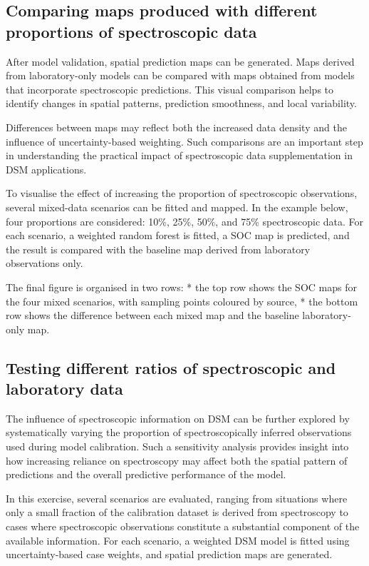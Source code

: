 \documentclass[
  10pt,
  b5paper,
  oneside]{book}
\begin{document}
\subsection{Comparing maps produced with different proportions of spectroscopic data}\label{comparing-maps-produced-with-different-proportions-of-spectroscopic-data}

After model validation, spatial prediction maps can be generated. Maps derived from laboratory-only models can be compared with maps obtained from models that incorporate spectroscopic predictions. This visual comparison helps to identify changes in spatial patterns, prediction smoothness, and local variability.

Differences between maps may reflect both the increased data density and the influence of uncertainty-based weighting. Such comparisons are an important step in understanding the practical impact of spectroscopic data supplementation in DSM applications.

To visualise the effect of increasing the proportion of spectroscopic observations, several mixed-data scenarios can be fitted and mapped. In the example below, four proportions are considered: 10\%, 25\%, 50\%, and 75\% spectroscopic data. For each scenario, a weighted random forest is fitted, a SOC map is predicted, and the result is compared with the baseline map derived from laboratory observations only.

The final figure is organised in two rows:
* the top row shows the SOC maps for the four mixed scenarios, with sampling points coloured by source,
* the bottom row shows the difference between each mixed map and the baseline laboratory-only map.

\subsection{Testing different ratios of spectroscopic and laboratory data}\label{testing-different-ratios-of-spectroscopic-and-laboratory-data}

The influence of spectroscopic information on DSM can be further explored by systematically varying the proportion of spectroscopically inferred observations used during model calibration. Such a sensitivity analysis provides insight into how increasing reliance on spectroscopy may affect both the spatial pattern of predictions and the overall predictive performance of the model.

In this exercise, several scenarios are evaluated, ranging from situations where only a small fraction of the calibration dataset is derived from spectroscopy to cases where spectroscopic observations constitute a substantial component of the available information.
For each scenario, a weighted DSM model is fitted using uncertainty-based case weights, and spatial prediction maps are generated.
\end{document}
